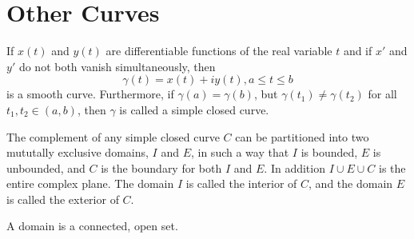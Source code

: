 \documentclass[handout]{ximera}
\begin{document}
\section{Other Curves}


\begin{example}[example 8]
If $x(t)$ and $y(t)$ are differentiable functions of the real variable $t$ and if $x'$ and $y'$ do not both vanish simultaneously,
then
\[
\gamma(t)= x(t) + iy(t),  a \leq t \leq b
\]
is a smooth curve. Furthermore, if $\gamma(a) =\gamma(b)$, but $\gamma(t_1) \neq \gamma(t_2)$ for all $t_1,t_2 \in (a,b)$,
then $\gamma$ is called a simple closed curve.

\end{example}

\begin{theorem}
The complement of any simple closed curve $C$ can be partitioned into two mututally exclusive domains, $I$ and $E$, in such a way that $I$ is bounded,
$E$ is unbounded, and $C$ is the boundary for both $I$ and $E$. In addition $I \cup E \cup C$ is the entire complex plane.
The domain $I$ is called the interior of $C$, and the domain $E$ is called the exterior of $C$.
\end{theorem}

\begin{remark} A domain is a connected, open set.
\end{remark}

\begin{image}
\end{image}
\end{document}
